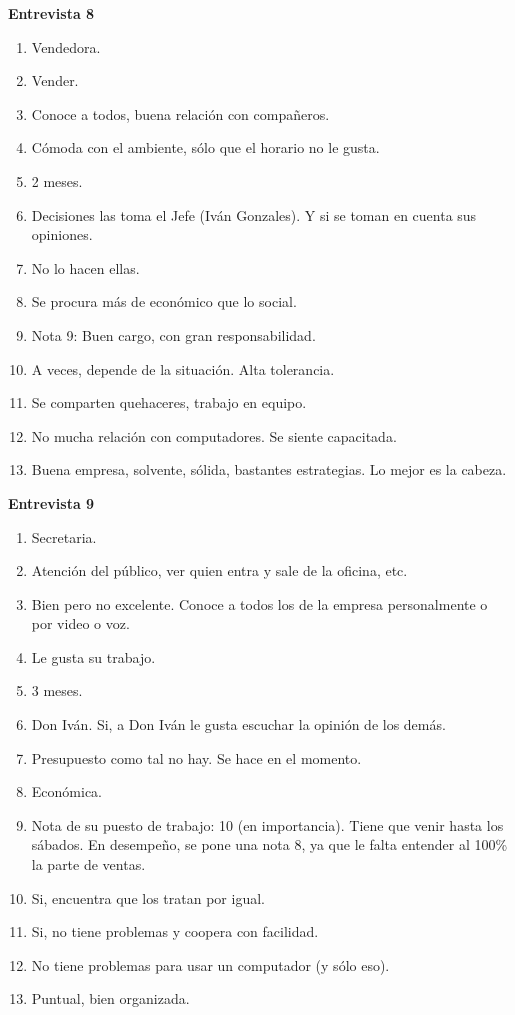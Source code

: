 \newpage
\textbf{Entrevista 8}\\
\begin{enumerate}
	\item Vendedora.
	\item Vender.
	\item Conoce a todos, buena relación con compañeros.
	\item Cómoda con el ambiente, sólo que el horario no le gusta.
	\item 2 meses.
	\item Decisiones las toma el Jefe (Iván Gonzales). Y si se toman en cuenta sus opiniones.
	\item No lo hacen ellas.
	\item Se procura más de económico que lo social.
	\item Nota 9: Buen cargo, con gran responsabilidad.
	\item A veces, depende de la situación. Alta tolerancia.
	\item Se comparten quehaceres, trabajo en equipo.
	\item No mucha relación con computadores. Se siente capacitada.
	\item Buena empresa, solvente, sólida, bastantes estrategias. Lo mejor es la cabeza.
\end{enumerate}

\newpage
\textbf{Entrevista 9}\\
\begin{enumerate}
	\item Secretaria.
	\item Atención del público, ver quien entra y sale de la oficina, etc.
	\item Bien pero no excelente. Conoce a todos los de la empresa personalmente o por video o voz.
	\item Le gusta su trabajo.
	\item 3 meses.
	\item Don Iván. Si, a Don Iván le gusta escuchar la opinión de los demás.
	\item Presupuesto como tal no hay. Se hace en el momento.
	\item Económica.
	\item Nota de su puesto de trabajo: 10 (en importancia). Tiene que venir hasta los sábados. En desempeño, se pone una nota 8, ya que le falta entender al 100\% la parte de ventas.
	\item Si, encuentra que los tratan por igual.
	\item Si, no tiene problemas y coopera con facilidad.
	\item No tiene problemas para usar un computador (y sólo eso).
	\item Puntual, bien organizada.
\end{enumerate}

